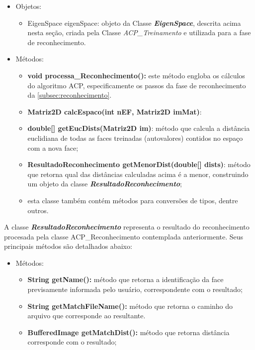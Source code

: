\begin{itemize}	
		\item Objetos:
	\begin{itemize}
		\item EigenSpace eigenSpace: objeto da Classe \textbf{\textit{EigenSpace}}, descrita acima nesta seção, criada pela Classe \textit{ACP\_Treinamento} e utilizada para a fase de reconhecimento.
	\end{itemize}
	
	
	\item Métodos:
	\begin{itemize}
		\item \textbf{void processa\_Reconhecimento():} este método engloba os cálculos do algoritmo ACP, especificamente os passos da fase de reconhecimento da \autoref{subsec:reconhecimento}.
		
		\item \textbf{Matriz2D calcEspaco(int nEF, Matriz2D imMat)}:
		
		\item \textbf{double[] getEucDists(Matriz2D im)}: método que calcula a distância euclidiana de todas as faces treinadas (autovalores) contidos no espaço com a nova face;
		
		\item \textbf{ResultadoReconhecimento getMenorDist(double[] dists)}: método que retorna qual das distâncias calculadas acima é a menor, construindo um objeto da classe \textit{\textbf{ResultadoReconhecimento}};
		
		\item esta classe também contém métodos para conversões de tipos, dentre outros.
		
		
	\end{itemize}
\end{itemize}



A classe \textit{\textbf{ResultadoReconhecimento}} representa o resultado do reconhecimento procesada pela classe ACP\_Reconhecimento contemplada anteriormente. Seus principais métodos são detalhados abaixo:


\begin{itemize}	
	\item Métodos:
	\begin{itemize}
		\item \textbf{String getName():} método que retorna a identificação da face previsamente informada pelo usuário, correspondente com o resultado;		
		\item \textbf{String getMatchFileName():} método que retorna o caminho do arquivo que corresponde ao resultante.
		\item \textbf{BufferedImage getMatchDist():} método que retorna distância corresponde com o resultado;
	\end{itemize}
\end{itemize}





